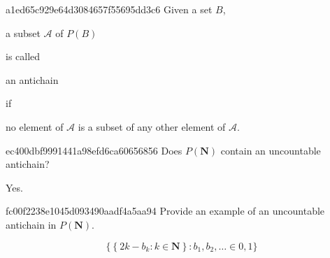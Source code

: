 \begin{note}{a1ed65c929e64d3084657f55695dd3c6}
    Given a set \({ B }\), \begin{icloze}{3}a subset \({ \mathcal A }\) of \({ P(B) }\)\end{icloze} is called \begin{icloze}{2}an antichain\end{icloze} if \begin{icloze}{1}no element of \({ \mathcal A }\) is a subset of any other element of \({ \mathcal A }\).\end{icloze}
\end{note}

\begin{note}{ec400dbf9991441a98efd6ca60656856}
    Does \({ P(\mathbf{N}) }\) contain an uncountable antichain?

    \begin{cloze}{1}
        Yes.
    \end{cloze}
\end{note}

\begin{note}{fc00f2238e1045d093490aadf4a5aa94}
    Provide an example of an uncountable antichain in \({ P(\mathbf{N}) }\).

    \begin{cloze}{1}
        \[
            \Big\{ \left\{ 2k - b_k : k \in \mathbf{N} \right\} : b_1, b_2, \ldots \in {0, 1} \Big\}
        \]
    \end{cloze}
\end{note}


